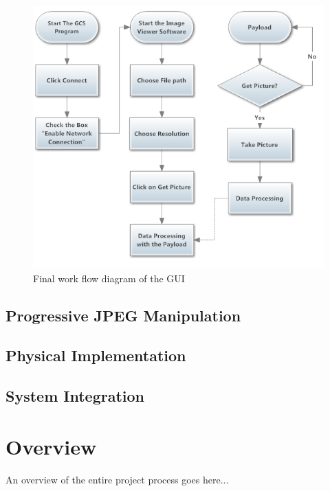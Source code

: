 \documentclass[oneside]{ecsgdp}         %
\begin{document}
\begin{figure}[!hbtp]
\begin{center}
\includegraphics[scale=1]{finalWorkFlow.PNG} 
\end{center}
\caption{Final work flow diagram of the GUI\label{GUI_finalWorkFlow}}
\end{figure}

\section{Progressive JPEG Manipulation}

\section{Physical Implementation}

\section{System Integration}


\chapter{Overview}
An overview of the entire project process goes here...
\end{document}
